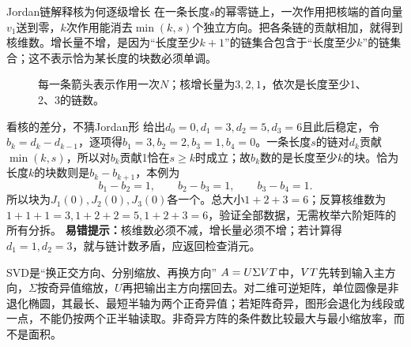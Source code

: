 \begin{insight}{Jordan链解释核为何逐级增长}
在一条长度$s$的幂零链上，一次作用把核端的首向量$v_1$送到零，$k$次作用能消去$\min(k,s)$个独立方向。把各条链的贡献相加，就得到核维数。增长量不增，是因为“长度至少$k+1$”的链集合包含于“长度至少$k$”的链集合；这不表示恰为某长度的块数必须单调。
\end{insight}
\begin{figure}[H]\centering
{}
\caption{每一条箭头表示作用一次$N$；核增长量为$3,2,1$，依次是长度至少1、2、3的链数。}\label{fig:jordan-kernel-growth}
\end{figure}
\begin{clevertrick}{看核的差分，不猜Jordan形}
给出$d_0=0,d_1=3,d_2=5,d_3=6$且此后稳定，令$b_k=d_k-d_{k-1}$，逐项得$b_1=3,b_2=2,b_3=1,b_4=0$。一条长度$s$的链对$d_k$贡献$\min(k,s)$，所以对$b_k$贡献1恰在$s\ge k$时成立；故$b_k$数的是长度至少$k$的块。恰为长度$k$的块数则是$b_k-b_{k+1}$，本例为
\[b_1-b_2=1,\qquad b_2-b_3=1,\qquad b_3-b_4=1.\]
所以块为$J_1(0),J_2(0),J_3(0)$各一个。总大小$1+2+3=6$；反算核维数为$1+1+1=3,1+2+2=5,1+2+3=6$，验证全部数据，无需枚举六阶矩阵的所有分拆。
\textbf{易错提示：}核维数必须不减，增长量必须不增；若计算得$d_1=1,d_2=3$，就与链计数矛盾，应返回检查消元。
\end{clevertrick}
\begin{insight}{SVD是“换正交方向、分别缩放、再换方向”}
$A=U\Sigma VT$中，$VT$先转到输入主方向，$\Sigma$按奇异值缩放，$U$再把输出主方向摆回去。对二维可逆矩阵，单位圆像是非退化椭圆，其最长、最短半轴为两个正奇异值；若矩阵奇异，图形会退化为线段或一点，不能仍按两个正半轴读取。非奇异方阵的条件数比较最大与最小缩放率，而不是面积。
\end{insight}
